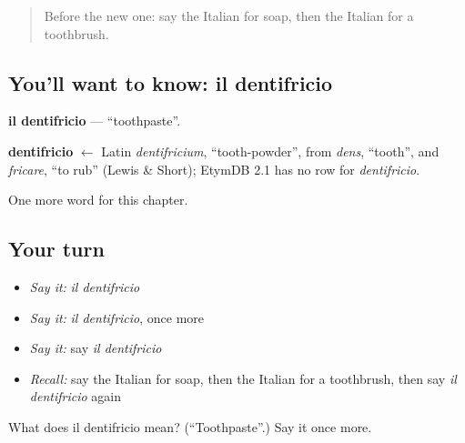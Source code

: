 \begin{quote}
Before the new one: say the Italian for soap, then the Italian for a toothbrush.
\end{quote}

\subsection*{You'll want to know: il dentifricio}
\textbf{il dentifricio} — \textquotedblleft{}toothpaste\textquotedblright{}.

\begin{cousinweb}
\textbf{dentifricio} $\leftarrow$ Latin \emph{dentifricium}, \textquotedblleft{}tooth-powder\textquotedblright{}, from \emph{dens}, \textquotedblleft{}tooth\textquotedblright{}, and \emph{fricare}, \textquotedblleft{}to rub\textquotedblright{} (Lewis \& Short); EtymDB 2.1 has no row for \emph{dentifricio}.
\end{cousinweb}

\begin{grammarlens}[title={What you've built}]
One more word for this chapter.
\end{grammarlens}

\subsection*{Your turn}
\begin{itemize}
\raggedright
  \item \emph{Say it:} \emph{il dentifricio}
  \item \emph{Say it:} \emph{il dentifricio}, once more
  \item \emph{Say it:} say \emph{il dentifricio}
  \item \emph{Recall:} say the Italian for soap, then the Italian for a toothbrush, then say \emph{il dentifricio} again
\end{itemize}

\begin{tcolorbox}[breakable,colback=teal!4,colframe=teal!35!black,title={Before you move on}]
What does il dentifricio mean? (\textquotedblleft{}Toothpaste\textquotedblright{}.) Say it once more.
\end{tcolorbox}
